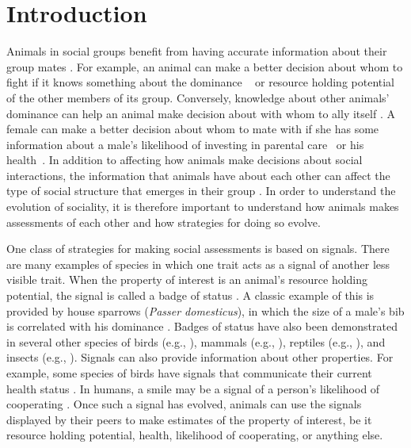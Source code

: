 \section*{Introduction} 
Animals in social groups benefit from having accurate information about their group mates \citep{Seyfarth:2010bh}. For example, an animal can make a better decision about whom to fight if it knows something about the dominance ~\citep{Waal:1986ys,Cowlishaw:1990vn,Bergman:2003qf,Seyfarth:2005ve,Flack:2006uq,Hobson:2015uq} or resource holding potential~\citep{Rhijn:1980uq,Freeman:1985kl,Dick:1990cr,Lemel:1993ve,Part:1997ys} of the other members of its group. Conversely, knowledge about other animals' dominance can help an animal make decision about with whom to ally itself \citep{Engh:2005qp}. A female can  make a better decision about whom to mate with if she has some information about a male's likelihood of investing in parental care~\citep{Qvarnstrom:1997fk,McGlothlin:2007au,Olsen:2010uq} or his health~\citep{Folstad:1992kx,Loyau:2005nx}. In addition to affecting how animals make decisions about social interactions, the information that animals have about each other can affect the type of social structure that emerges in their group \citep{Dugatkin:2004hz,Hobson:2015uq,Brush:2018ss}. In order to understand the evolution of sociality, it is therefore important to understand how animals makes assessments of each other and how strategies for doing so evolve.  

One class of strategies for making social assessments is based on signals. There are many examples of species in which one trait acts as a signal of another less visible trait. When the property of interest is an animal's resource holding potential, the signal is called a badge of status \citep{dawkins1978signals,Rohwer:1981vn,Rohwer:1982fk,Ripoll:2004vn,sheehan2016evotradeoff}. A classic example of this is provided by house sparrows (\emph{Passer domesticus}), in which the size of a male's bib is correlated with his dominance \citep{Veiga:1993fk,Veiga:1995ys}. Badges of status have also been demonstrated in several other species of birds (e.g., \citep{Remy:2010fk,Olsen:2010uq,Lemel:1993ve,Tibbetts:2009kx}), mammals (e.g., \citep{Gerald:2001zm}), reptiles (e.g., \citep{Fox:1990hd}), and insects (e.g., \citep{Tibbetts:2004kx}). Signals can also provide information about other properties. For example, some species of birds have signals that communicate their current health status \citep{Folstad:1992kx,Loyau:2005nx}. In humans, a smile may be a signal of a person's likelihood of cooperating \citep{Schug:2010be}. Once such a signal has evolved, animals can use the signals displayed by their peers to make estimates of the property of interest, be it resource holding potential, health, likelihood of cooperating, or anything else.

